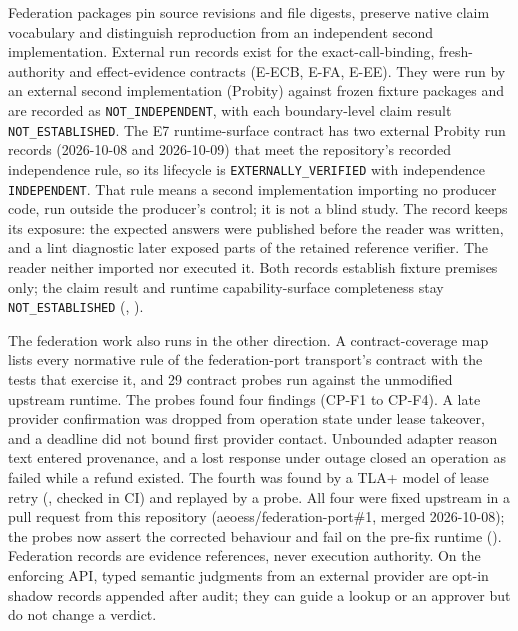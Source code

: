 \documentclass[10pt,twocolumn]{article}
\begin{document}
Federation packages pin source revisions and file digests, preserve native
claim vocabulary and distinguish reproduction from an independent second
implementation. External run records exist for the exact-call-binding,
fresh-authority and effect-evidence contracts (E-ECB, E-FA, E-EE). They were
run by an external second implementation (Probity) against frozen fixture
packages and are recorded as \texttt{NOT\_INDEPENDENT}, with each
boundary-level claim result \texttt{NOT\_ESTABLISHED}. The E7
runtime-surface contract has two external Probity run records (2026-10-08
and 2026-10-09) that meet the repository's recorded independence rule, so
its lifecycle is \texttt{EXTERNALLY\_VERIFIED} with independence
\texttt{INDEPENDENT}. That rule means a second implementation importing no
producer code, run outside the producer's control; it is not a blind study.
The record keeps its exposure: the expected answers were published before
the reader was written, and a lint diagnostic later exposed parts of the
retained reference verifier. The reader neither imported nor executed it. Both records establish fixture premises only; the claim result
and runtime capability-surface completeness stay \texttt{NOT\_ESTABLISHED}
(, ).

The federation work also runs in the other direction. A contract-coverage
map lists every normative rule of the federation-port transport's contract
with the tests that exercise it, and 29 contract probes run against the
unmodified upstream runtime. The probes found four findings (CP-F1 to
CP-F4). A late provider confirmation was dropped from operation state under
lease takeover, and a deadline did not bound first provider contact.
Unbounded adapter reason text entered provenance, and a lost response under
outage closed an operation as failed while a refund existed. The
fourth was found by a TLA+ model of lease retry
(, checked in CI) and replayed by a probe.
All four were fixed upstream in a pull request from this repository
(aeoess/federation-port\#1, merged 2026-10-08); the probes now assert the
corrected behaviour and fail on the pre-fix runtime
().
Federation records are evidence references, never execution authority. On
the enforcing API, typed semantic judgments from an external provider are
opt-in shadow records appended after audit; they can guide a lookup or an
approver but do not change a verdict.
\end{document}
